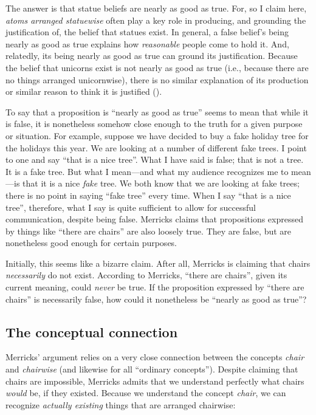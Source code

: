 \documentclass[11pt]{article}
\newenvironment{squote}{%
\begin{spacing}{1}
       	\begin{list}{}{%
\setlength{\labelwidth}{0pt}%
\rightmargin\leftmargin%
}
\item\relax
}{%
\end{list}%
\end{spacing}
}
\begin{document}
\begin{spacing}{1.25}
\begin{squote}
The answer is that statue beliefs are nearly as good as true.  For, so
I claim here, {\em atoms arranged statuewise} often play a key role in
producing, and grounding the justification of, the belief that statues
exist.  In general, a false belief's being nearly as good as true
explains how {\em reasonable} people come to hold it.  And, relatedly,
its being nearly as good as true can ground its justification.
Because the belief that unicorns exist is not nearly as good as true
(i.e., because there are no things arranged unicornwise), there is no
similar explanation of its production or similar reason to think it is
justified (\citeyear[171--172]{merricks2001a}).
\end{squote}

To say that a proposition is ``nearly as good as true'' seems to mean
that while it is false, it is nonetheless somehow close enough to the
truth for a given purpose or situation.  For example, suppose we have
decided to buy a fake holiday tree for the holidays this year.  We are
looking at a number of different fake trees.  I point to one and say
``that is a nice tree''.  What I have said is false; that is not a
tree.  It is a fake tree.  But what I mean---and what my audience
recognizes me to mean---is that it is a nice {\em fake} tree.  We both
know that we are looking at fake trees; there is no point in saying
``fake tree'' every time.  When I say ``that is a nice tree'',
therefore, what I say is quite sufficient to allow for successful
communication, despite being false.  Merricks claims that propositions
expressed by things like ``there are chairs'' are also loosely true.
They are false, but are nonetheless good enough for certain purposes.

Initially, this seems like a bizarre claim.  After all, Merricks is
claiming that chairs {\em necessarily} do not exist.  According to
Merricks, ``there are chairs'', given its current meaning, could {\em
  never} be true.  If the proposition expressed by ``there are
chairs'' is necessarily false, how could it nonetheless be ``nearly as
good as true''?

\subsection{The conceptual connection}
\label{connection}
Merricks' argument relies on a very close connection between the
concepts {\em chair} and {\em chairwise} (and likewise for all
``ordinary concepts'').  Despite claiming that chairs are impossible,
Merricks admits that we understand perfectly what chairs {\em would}
be, if they existed.  Because we understand the concept {\em chair},
we can recognize {\em actually existing} things that are arranged
chairwise:


\end{spacing}
\end{document}

